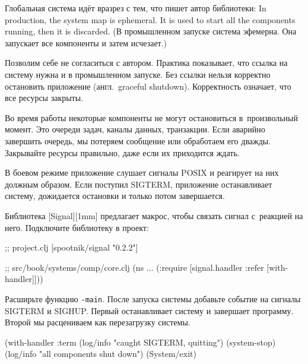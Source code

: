 
Глобальная система идёт вразрез с тем, что пишет автор библиотеки: In
production, the system map is ephemeral. It is used to start all the components
running, then it is discarded. (В промышленном запуске система эфемерна. Она
запускает все компоненты и затем исчезает.)


Позволим себе не согласиться с автором. Практика показывает, что ссылка на
систему нужна и в промышленном запуске. Без ссылки нельзя корректно остановить
приложение (англ.~graceful shutdown). Корректность означает, что все ресурсы
закрыты.

Во время работы некоторые компоненты не могут остановиться в~произвольный
момент. Это очереди задач, каналы данных, транзакции. Если аварийно завершить
очередь, мы потеряем сообщение или обработаем его дважды. Закрывайте ресурсы
правильно, даже если их приходится ждать.


В боевом режиме приложение слушает сигналы POSIX и реагирует на них должным
образом. Если поступил SIGTERM, приложение останавливает систему, дожидается
остановки и только потом завершается.


Библиотека [Signal][1mm] предлагает макрос,
чтобы связать сигнал с~реакцией на него. Подключите библиотеку в проект:

\begin{english}
  \begin{clojure}
;; project.clj
[spootnik/signal "0.2.2"]

;; src/book/systems/comp/core.clj
(ns ...
  (:require [signal.handler :refer [with-handler]]))
  \end{clojure}
\end{english}

Расширьте функцию \verb|-main|. После запуска системы добавьте событие на
сигналы SIGTERM и SIGHUP. Первый останавливает систему и завершает
программу. Второй мы расцениваем как перезагрузку системы.

\begin{english}
  \begin{clojure}
(with-handler :term
  (log/info "caught SIGTERM, quitting")
  (system-stop)
  (log/info "all components shut down")
  (System/exit)
  \end{clojure}
\end{english}

